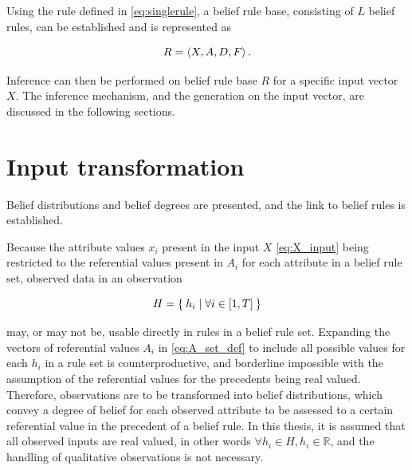 Using the rule defined in \eqref{eq:singlerule}, a belief rule base, consisting of $L$ belief rules, can be established
and is represented as

\begin{equation}
    \label{eq:genericrule}
    R = \braket{X, A, D, F}.
\end{equation}

Inference can then be performed on belief rule base $R$ for a specific input vector $X$.
The inference mechanism, and the generation on the input vector,
are discussed in the following sections.




\section{Input transformation}
\label{inputtransformation}
{\color{red}
Belief distributions and belief degrees are presented, and the link to belief rules is established.
}

Because the attribute values $x_i$ present in the input $X$ \eqref{eq:X_input} being restricted to the referential values present in $A_i$
for each attribute in a belief rule set, observed data in an observation

\begin{equation}
    \label{eq:observation}
    H = \Set{h_i \mid \forall i \in \left[1, T\right]}
\end{equation}

may, or may not be, usable directly in rules in a belief rule set. Expanding the vectors of referential values $A_i$ in
\eqref{eq:A_set_def} to include all possible values for each $h_i$ in
a rule set
is counterproductive, and borderline impossible with the assumption of the referential values for the precedents being real valued.
Therefore, observations are to be transformed into belief distributions, which convey a degree of belief for each observed attribute to
be assessed to a certain referential value in the precedent of a belief rule. In this thesis, it is assumed that all observed 
inputs are real valued, in other words $\forall h_i \in H, h_i \in \mathbb{R}$, and the handling of qualitative observations is not necessary.

